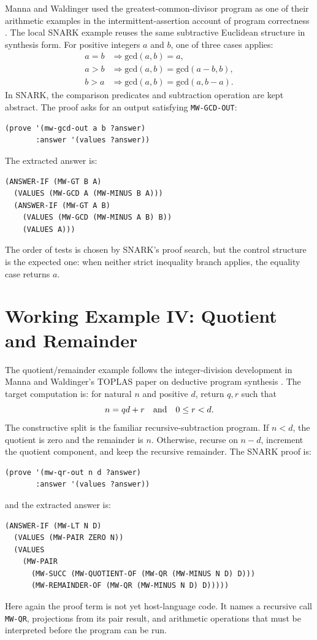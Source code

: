 \documentclass[runningheads]{llncs}
\begin{document}
Manna and Waldinger used the greatest-common-divisor program as one of their
arithmetic examples in the intermittent-assertion account of program
correctness \cite{MannaWaldinger1978}.  The local SNARK example reuses the same
subtractive Euclidean structure in synthesis form.  For positive integers
\(a\) and \(b\), one of three cases applies:
\begin{align*}
  a=b &\Rightarrow \mathrm{gcd}(a,b)=a,\\
  a>b &\Rightarrow \mathrm{gcd}(a,b)=\mathrm{gcd}(a-b,b),\\
  b>a &\Rightarrow \mathrm{gcd}(a,b)=\mathrm{gcd}(a,b-a).
\end{align*}
In SNARK, the comparison predicates and subtraction operation are kept
abstract.  The proof asks for an output satisfying \texttt{MW-GCD-OUT}:
\begin{lstlisting}
(prove '(mw-gcd-out a b ?answer)
       :answer '(values ?answer))
\end{lstlisting}
The extracted answer is:
\begin{lstlisting}
(ANSWER-IF (MW-GT B A)
  (VALUES (MW-GCD A (MW-MINUS B A)))
  (ANSWER-IF (MW-GT A B)
    (VALUES (MW-GCD (MW-MINUS A B) B))
    (VALUES A)))
\end{lstlisting}
The order of tests is chosen by SNARK's proof search, but the control
structure is the expected one: when neither strict inequality branch applies,
the equality case returns \(a\).

\section{Working Example IV: Quotient and Remainder}

The quotient/remainder example follows the integer-division development in
Manna and Waldinger's TOPLAS paper on deductive program synthesis
\cite{MannaWaldinger1980}.  The target computation is: for natural \(n\) and
positive \(d\), return \(q,r\) such that
\[
  n = qd + r \quad\hbox{and}\quad 0 \leq r < d.
\]
The constructive split is the familiar recursive-subtraction program.  If
\(n<d\), the quotient is zero and the remainder is \(n\).  Otherwise, recurse
on \(n-d\), increment the quotient component, and keep the recursive remainder.
The SNARK proof is:
\begin{lstlisting}
(prove '(mw-qr-out n d ?answer)
       :answer '(values ?answer))
\end{lstlisting}
and the extracted answer is:
\begin{lstlisting}
(ANSWER-IF (MW-LT N D)
  (VALUES (MW-PAIR ZERO N))
  (VALUES
    (MW-PAIR
      (MW-SUCC (MW-QUOTIENT-OF (MW-QR (MW-MINUS N D) D)))
      (MW-REMAINDER-OF (MW-QR (MW-MINUS N D) D)))))
\end{lstlisting}
Here again the proof term is not yet host-language code.  It names a recursive
call \texttt{MW-QR}, projections from its pair result, and arithmetic
operations that must be interpreted before the program can be run.
\end{document}
